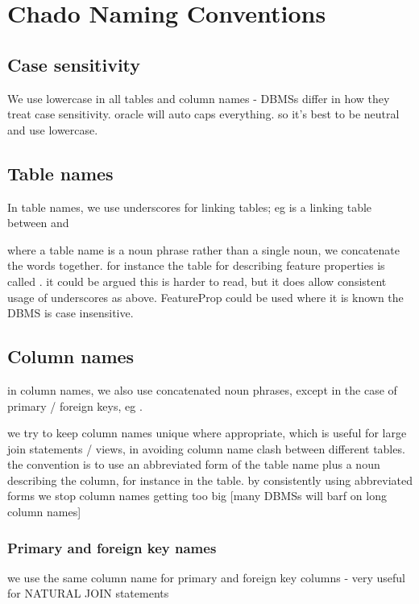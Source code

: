 \chapter{Chado Naming Conventions}

\section{Case sensitivity}

We use lowercase in all tables and column names - DBMSs differ in how
they treat case sensitivity. oracle will auto caps everything. so it's
best to be neutral and use lowercase.

\section{Table names}

In table names, we use underscores for linking tables; eg
 is a linking table between  and 

where a table name is a noun phrase rather than a single noun, we
concatenate the words together. for instance the table for describing
feature properties is called . it could be argued
this is harder to read, but it does allow consistent usage of
underscores as above. FeatureProp could be used where it is known the
DBMS is case insensitive.

\section{Column names}

in column names, we also use concatenated noun phrases, except in the
case of primary / foreign keys, eg .

we try to keep column names unique where appropriate, which is useful
for large join statements / views, in avoiding column name clash
between different tables. the convention is to use an abbreviated form
of the table name plus a noun describing the column, for instance
 in the 
table. by consistently using abbreviated forms we stop column names
getting too big [many DBMSs will barf on long column names]

\subsection{Primary and foreign key names}

we use the same column name for primary and foreign key columns - very
useful for NATURAL JOIN statements


